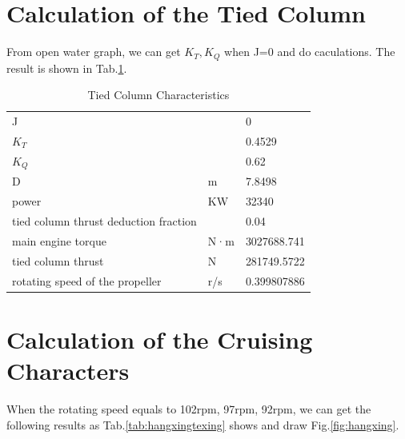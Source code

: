 \documentclass[a4paper,UTF8]{article}
\begin{document}
\section{Calculation of the Tied Column}
From open water graph, we can get $K_T,K_Q$ when J=0 and do caculations. The result is shown in Tab.\ref{tab:xizhu}.
\begin{table}[h]
	\centering

	\begin{tabular}{lll}
		\hline
		J      &     & 0           \\
		$K_T$     &     & 0.4529       \\
		$K_Q$     &     & 0.62     \\
  		  D     & m     & 7.8498 \\
	power & KW    & 32340 \\
	 tied column thrust deduction fraction &       & 0.04 \\
main engine torque  & N·m   & 3027688.741 \\
tied column thrust  & N     & 281749.5722 \\
rotating speed of the propeller  & r/s   & 0.399807886 \\
		\hline
	\end{tabular}
	\caption{Tied Column Characteristics}
	\label{tab:xizhu}
\end{table}

\section{Calculation of the Cruising Characters}
When the rotating speed equals to 102rpm, 97rpm, 92rpm, we can get the following results as Tab.\ref{tab:hangxingtexing} shows and draw Fig.\ref{fig:hangxing}.
\end{document}

